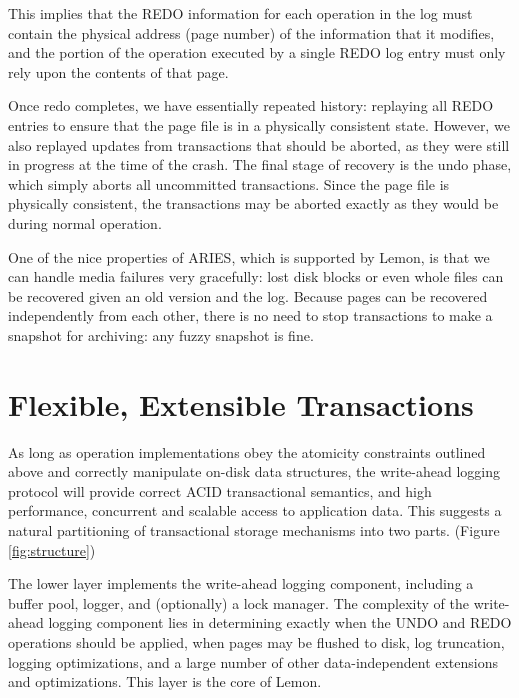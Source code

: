 \documentclass[10pt,letterpaper,twocolumn,english]{article}
\newcommand{\yad}{Lemon\xspace}
\begin{document}
This implies that the REDO information for each operation in the log
must contain the physical address (page number) of the information
that it modifies, and the portion of the operation executed by a
single REDO log entry must only rely upon the contents of that
page.

Once redo completes, we have essentially repeated history: replaying
all REDO entries to ensure that the page file is in a physically
consistent state.  However, we also replayed updates from transactions
that should be aborted, as they were still in progress at the time of
the crash.  The final stage of recovery is the undo phase, which simply
aborts all uncommitted transactions. Since the page file is physically
consistent, the transactions may be aborted exactly as they would be
during normal operation.

One of the nice properties of ARIES, which is supported by \yad,
is that we can handle media failures very gracefully: lost disk blocks
or even whole files can be recovered given an old version and the log.
Because pages can be recovered independently from each other, there is
no need to stop transactions to make a snapshot for archiving: any
fuzzy snapshot is fine.



\section{Flexible, Extensible Transactions}
\label{flexibility}



As long as operation implementations obey the atomicity constraints
outlined above and correctly manipulate
on-disk data structures, the write-ahead logging protocol will provide 
correct ACID transactional semantics, and high performance, concurrent and scalable access to
application data.  This suggests a
natural partitioning of transactional storage mechanisms into two
parts. (Figure \ref{fig:structure})

The lower layer implements the write-ahead logging component,
including a buffer pool, logger, and (optionally) a lock manager.  
The complexity of the write-ahead logging component lies in
determining exactly when the UNDO and REDO operations should be
applied, when pages may be flushed to disk, log truncation, logging
optimizations, and a large number of other data-independent extensions
and optimizations.  This layer is the core of \yad.
\end{document}
